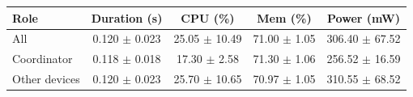 \begin{tabular}{lcccc}
\hline
\textbf{Role} & \textbf{Duration (s)} & \textbf{CPU (\%)} & \textbf{Mem (\%)} & \textbf{Power (mW)} \\
\hline
All & 0.120 $\pm$ 0.023 & 25.05 $\pm$ 10.49 & 71.00 $\pm$ 1.05 & 306.40 $\pm$ 67.52 \\
Coordinator & 0.118 $\pm$ 0.018 & 17.30 $\pm$ 2.58 & 71.30 $\pm$ 1.06 & 256.52 $\pm$ 16.59 \\
Other devices & 0.120 $\pm$ 0.023 & 25.70 $\pm$ 10.65 & 70.97 $\pm$ 1.05 & 310.55 $\pm$ 68.52 \\
\hline
\end{tabular}
